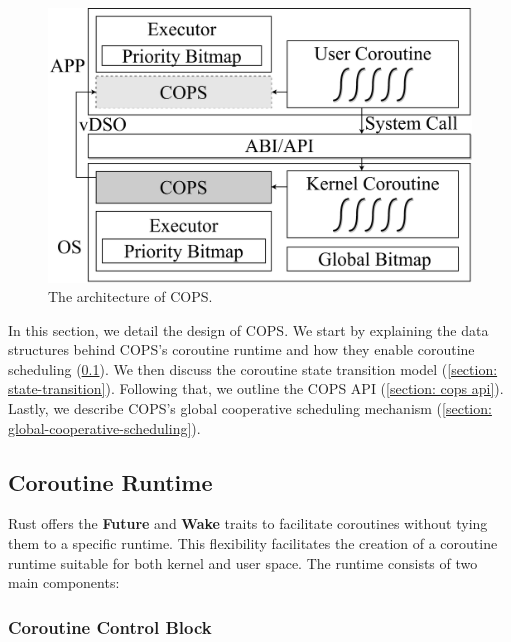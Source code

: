 \documentclass[conference]{IEEEtran}
\begin{document}
\begin{figure}[tbp]
  \centering
  \includegraphics[width=\linewidth]{assets/arch.pdf}
  \caption{The architecture of COPS.}
  \label{fig:arch}
  \vspace{-1em}
\end{figure}

In this section, we detail the design of COPS. We start by explaining the data structures behind COPS's coroutine runtime and how they enable coroutine scheduling (\ref{section: Coroutine Runtime}). We then discuss the coroutine state transition model (\ref{section: state-transition}). Following that, we outline the COPS API (\ref{section: cops api}). Lastly, we describe COPS's global cooperative scheduling mechanism (\ref{section: global-cooperative-scheduling}).

\subsection{Coroutine Runtime}
\label{section: Coroutine Runtime}

Rust offers the \textbf{Future} and \textbf{Wake} traits to facilitate coroutines without tying them to a specific runtime. This flexibility facilitates the creation of a coroutine runtime suitable for both kernel and user space. The runtime consists of two main components: 

\subsubsection{Coroutine Control Block}
\end{document}
